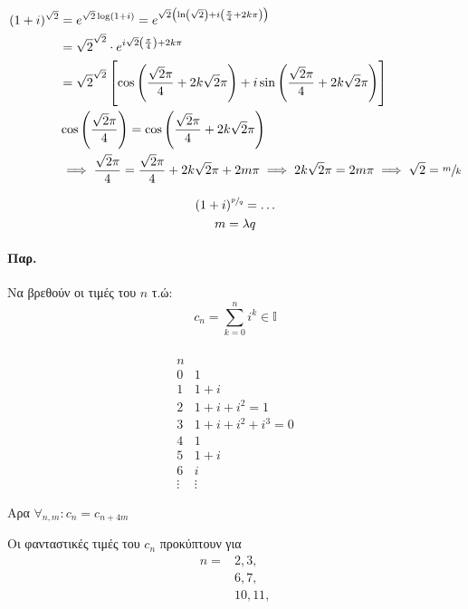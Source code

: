 \documentclass[12pt,a4paper,titlepage,fleqn]{article}
\begin{document}
    \begin{align*}
    (1+i)^{\sqrt{2}} &= e^{\sqrt{2}\log(1+i)} = e^{\sqrt{2}\left(
    	\ln\left(\sqrt{2}\right)+i\left(\frac{\pi}{4}+2k\pi\right)
    	\right)} \\ &=
    \sqrt{2}^{\sqrt{2}}\cdot e^{i\sqrt{2}\left(\frac{\pi}{4}\right)+2k\pi}
    \\ &=
    \sqrt{2}^{\sqrt{2}}
    \left[
    \cos\left(\frac{\sqrt{2}\pi}{4}+2k\sqrt{2}\pi\right)
    +i\sin\left(\frac{\sqrt{2}\pi}{4}+2k\sqrt{2}\pi\right)
    \right]
    \\ & \cos\left( \frac{\sqrt{2}\pi}{4} \right) = \cos\left(
    \frac{\sqrt{2}\pi}{4}+2k\sqrt{2}\pi
    \right)\\ & \implies \frac{\sqrt{2}\pi}{4}=
    \frac{\sqrt{2}\pi}{4}+2k\sqrt{2}\pi+2m\pi \implies
    2k\sqrt{2}\pi=2m\pi\implies \sqrt{2}=\sfrac{m}{k}
    \end{align*}
    
    \begin{gather*}
    (1+i)^{\sfrac{p}{q}}=\dots\\ m=\lambda q
    \end{gather*}
    
    \paragraph{Παρ.}
    Να βρεθούν οι τιμές του \( n \) τ.ώ:
    \[
    c_n = \sum_{k=0}^n i^k \in \mathbb I
    \]
    
    \subparagraph{}
    \[
    \begin{array}{r|l}
    n & \\ \hline
    0 & 1 \\ 1 & 1+i \\ 2 & 1+i+i^2=1 \\ 3 & 1+i+i^2+i^3=0 \\ 4 & 1
    \\ \hline
    5 & 1+i \\ 6 & i \\ \vdots & \vdots
    \end{array}
    \]
    
    Αρα \( \forall_{n,m}: c_n=c_{n+4m} \)
    
    Οι φανταστικές τιμές του \( c_n \) προκύπτουν για
    \begin{align*}
    	n =& 2,3, \\& 6,7, \\ & 10,11,
    \end{align*}
    
\end{document}
